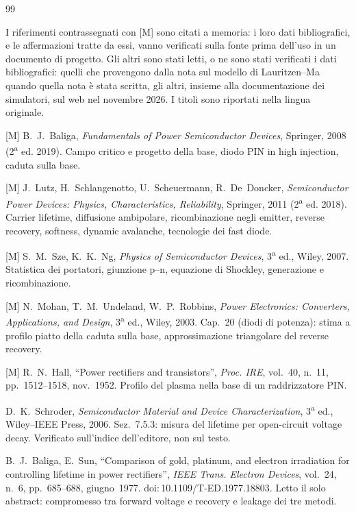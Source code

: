 \documentclass[10pt,a4paper]{scrartcl}
\begin{document}
\begin{thebibliography}{99}
\small
\item[] I riferimenti contrassegnati con [M] sono citati a memoria: i loro dati bibliografici, e le affermazioni tratte da essi, vanno verificati sulla fonte prima dell'uso in un documento di progetto. Gli altri sono stati letti, o ne sono stati verificati i dati bibliografici: quelli che provengono dalla nota sul modello di Lauritzen--Ma quando quella nota è stata scritta, gli altri, insieme alla documentazione dei simulatori, sul web nel novembre 2026. I titoli sono riportati nella lingua originale.

[M] B.~J.~Baliga, \emph{Fundamentals of Power Semiconductor Devices}, Springer, 2008 (2\textsuperscript{a} ed. 2019). Campo critico e progetto della base, diodo PIN in high injection, caduta sulla base.

[M] J.~Lutz, H.~Schlangenotto, U.~Scheuermann, R.~De~Doncker, \emph{Semiconductor Power Devices: Physics, Characteristics, Reliability}, Springer, 2011 (2\textsuperscript{a} ed. 2018). Carrier lifetime, diffusione ambipolare, ricombinazione negli emitter, reverse recovery, softness, dynamic avalanche, tecnologie dei fast diode.

[M] S.~M.~Sze, K.~K.~Ng, \emph{Physics of Semiconductor Devices}, 3\textsuperscript{a} ed., Wiley, 2007. Statistica dei portatori, giunzione p--n, equazione di Shockley, generazione e ricombinazione.

[M] N.~Mohan, T.~M.~Undeland, W.~P.~Robbins, \emph{Power Electronics: Converters, Applications, and Design}, 3\textsuperscript{a} ed., Wiley, 2003. Cap.~20 (diodi di potenza): stima a profilo piatto della caduta sulla base, approssimazione triangolare del reverse recovery.

[M] R.~N.~Hall, ``Power rectifiers and transistors'', \emph{Proc. IRE}, vol.~40, n.~11, pp.~1512--1518, nov.~1952. Profilo del plasma nella base di un raddrizzatore PIN.

D.~K.~Schroder, \emph{Semiconductor Material and Device Characterization}, 3\textsuperscript{a} ed., Wiley--IEEE Press, 2006. Sez.~7.5.3: misura del lifetime per open-circuit voltage decay. Verificato sull'indice dell'editore, non sul testo.

B.~J.~Baliga, E.~Sun, ``Comparison of gold, platinum, and electron irradiation for controlling lifetime in power rectifiers'', \emph{IEEE Trans. Electron Devices}, vol.~24, n.~6, pp.~685--688, giugno~1977. doi:\,10.1109/T-ED.1977.18803. Letto il solo abstract: compromesso tra forward voltage e recovery e leakage dei tre metodi.


\end{thebibliography}
\end{document}
